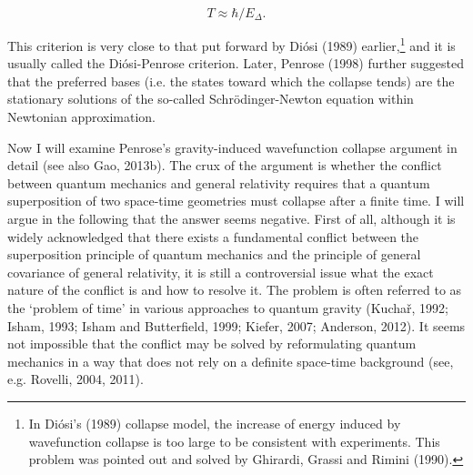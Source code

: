 \begin{equation}
T \approx \hbar/E_{\Delta}.
\label{PCT}
\end{equation}

\noindent This criterion is very close to that put forward by Di\'{o}si (1989) earlier,\footnote{In Di\'{o}si's (1989) collapse model, the increase of energy induced by wavefunction collapse is too large to be consistent with experiments. This problem was pointed out and solved by Ghirardi, Grassi and Rimini (1990).} and it is usually called the Di\'{o}si-Penrose criterion. Later, Penrose (1998) further suggested that the preferred bases (i.e. the states toward which the collapse tends) are the stationary solutions of the so-called Schr\"{o}dinger-Newton equation within Newtonian approximation.

Now I will examine Penrose's gravity-induced wavefunction collapse argument in detail (see also Gao, 2013b). The crux of the argument is whether the conflict between quantum mechanics and general relativity requires that a quantum superposition of two space-time geometries must collapse after a finite time. I will argue in the following that the answer seems negative. First of all, although it is widely acknowledged that there exists a fundamental conflict between the superposition principle of quantum mechanics and the principle of general covariance of general relativity, it is still a controversial issue what the exact nature of the conflict is and how to resolve it. The problem is often referred to as the `problem of time' in various approaches to quantum gravity (Kucha\v r, 1992; Isham, 1993; Isham and Butterfield, 1999; Kiefer, 2007; Anderson, 2012). It seems not impossible that the conflict may be solved by reformulating quantum mechanics in a way that does not rely on a definite space-time background (see, e.g. Rovelli, 2004, 2011).

